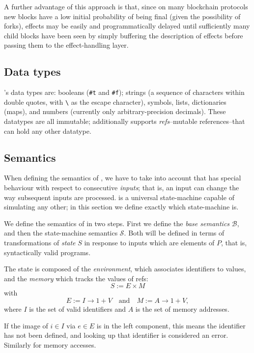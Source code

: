 A further advantage of this approach is that, since on many blockchain
protocols new blocks have a low initial probability of being final (given the
possibility of forks), effects may be easily and programmatically delayed until
sufficiently many child blocks have been seen by simply buffering the
description of effects before passing them to the effect-handling layer.

\subsection{Data types} \rad's data types are: booleans (\texttt{\#t} and
\texttt{\#f}); strings (a sequence of characters within double quotes, with
\texttt{\textbackslash} as the escape character), symbols, lists, dictionaries
(maps), and numbers (currently only arbitrary-precision decimals). These
datatypes are all immutable; additionally \rad supports \emph{refs}--mutable
references--that can hold any other datatype.

\subsection{Semantics}

\def\S{\mathcal{S}}
\def\B{\mathcal{B}}
\def\E{\mathcal{E}}
\def\Prog{\mathrm{Prog}}
\def\Func{\mathrm{Func}}

When defining the semantics of \rad, we have to take into account that \rad has
special behaviour with respect to consecutive \emph{inputs}; that is, an input
can change the way subsequent inputs are processed. \rad is a universal
state-machine capable of simulating any other; in this section we define exactly
which state-machine \rad is.

We define the semantics of \rad in two steps. First we define the \emph{base
  semantics} $\B$, and then the state-machine semantics $\S$. Both will be
defined in terms of transformations of \emph{state} $S$ in response to inputs
which are elements of $P$, that is, syntactically valid programs.

The state is composed of the \emph{environment}, which associates identifiers to
values, and the \emph{memory} which tracks the values of refs:
\[
S := E \times M
\]
with
\[
E := I \to 1 + V \quad \text{and} \quad M := A \to 1 + V,
\]
where $I$ is the set of valid identifiers and $A$ is the set of memory addresses.

If the image of $i \in I$ via $e \in E$ is in the left component, this means the
identifier has not been defined, and looking up that identifier is considered an
error. Similarly for memory accesses.

